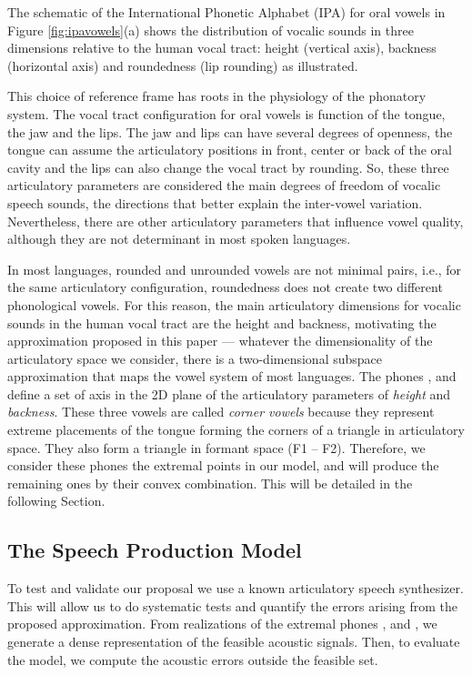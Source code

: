 The schematic of the International Phonetic Alphabet (IPA) for oral
vowels in Figure \ref{fig:ipavowels}(a) shows the distribution of
vocalic sounds in three dimensions relative to the human vocal tract:
height (vertical axis), backness (horizontal axis) and roundedness
(lip rounding) \cite{IPA} as illustrated.
 
This choice of reference frame has roots in the physiology of the
phonatory system. The vocal tract configuration for oral vowels is
function of the tongue, the jaw and the lips. The jaw and lips can
have several degrees of openness, the tongue can assume the
articulatory positions in front, center or back of the oral cavity and
the lips can also change the vocal tract by rounding. So, these three
articulatory parameters are considered the main degrees of freedom of
vocalic speech sounds, the directions that better explain the
inter-vowel variation. Nevertheless, there are other articulatory
parameters that influence vowel quality, although they are not
determinant in most spoken languages.

In most languages, rounded and unrounded vowels are not minimal pairs,
i.e., for the same articulatory configuration, roundedness does not
create two different phonological vowels. For this reason, the main
articulatory dimensions for vocalic sounds in the human vocal tract
are the height and backness, motivating the approximation proposed in
this paper --- whatever the dimensionality of the articulatory space
we consider, there is a two-dimensional subspace approximation that
maps the vowel system of most languages.
The phones  \textipa{[i]}, \textipa{[a]} and \textipa{[u]} define a
set of axis in the 2D plane of the articulatory parameters of
\emph{height} and \emph{backness}. These three vowels are called
\emph{corner vowels} because they represent extreme placements of the
tongue forming the corners of a triangle in articulatory space. They
also form a triangle in formant space (F1 --
F2)\cite{TITZE}. Therefore, we consider these phones the extremal
points in our model, and will produce the remaining ones by their
convex combination. This will be detailed in the following Section.

\subsection{The Speech Production Model}
To test and validate our proposal we use a known articulatory speech
synthesizer. This will allow us to do systematic tests and quantify
the errors arising from the proposed approximation. From realizations
of the extremal phones \textipa{[i]}, \textipa{[a]} and \textipa{[u]},
we generate a dense representation of the feasible acoustic
signals. Then, to evaluate the model, we compute the acoustic errors
outside the feasible set.

